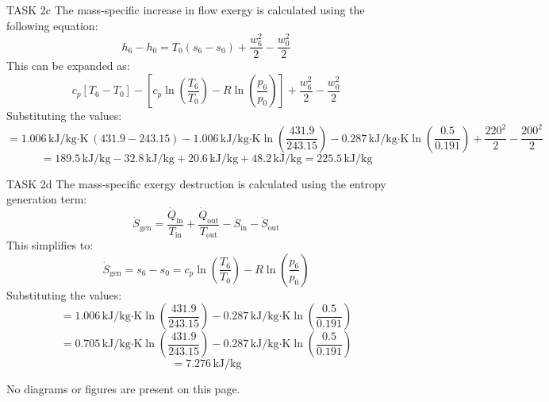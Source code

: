 TASK 2c  
The mass-specific increase in flow exergy is calculated using the following equation:  
\[
h_6 - h_0 = T_0 (s_6 - s_0) + \frac{w_6^2}{2} - \frac{w_0^2}{2}
\]  
This can be expanded as:  
\[
c_p [T_6 - T_0] - \left[ c_p \ln \left( \frac{T_6}{T_0} \right) - R \ln \left( \frac{p_6}{p_0} \right) \right] + \frac{w_6^2}{2} - \frac{w_0^2}{2}
\]  
Substituting the values:  
\[
= 1.006 \, \text{kJ/kg·K} \, (431.9 - 243.15) - 1.006 \, \text{kJ/kg·K} \ln \left( \frac{431.9}{243.15} \right) - 0.287 \, \text{kJ/kg·K} \ln \left( \frac{0.5}{0.191} \right) + \frac{220^2}{2} - \frac{200^2}{2}
\]  
\[
= 189.5 \, \text{kJ/kg} - 32.8 \, \text{kJ/kg} + 20.6 \, \text{kJ/kg} + 48.2 \, \text{kJ/kg} = 225.5 \, \text{kJ/kg}
\]

TASK 2d  
The mass-specific exergy destruction is calculated using the entropy generation term:  
\[
\dot{S}_{\text{gen}} = \frac{\dot{Q}_{\text{in}}}{T_{\text{in}}} + \frac{\dot{Q}_{\text{out}}}{T_{\text{out}}} - \dot{S}_{\text{in}} - \dot{S}_{\text{out}}
\]  
This simplifies to:  
\[
\dot{S}_{\text{gen}} = s_6 - s_0 = c_p \ln \left( \frac{T_6}{T_0} \right) - R \ln \left( \frac{p_6}{p_0} \right)
\]  
Substituting the values:  
\[
= 1.006 \, \text{kJ/kg·K} \ln \left( \frac{431.9}{243.15} \right) - 0.287 \, \text{kJ/kg·K} \ln \left( \frac{0.5}{0.191} \right)
\]  
\[
= 0.705 \, \text{kJ/kg·K} \ln \left( \frac{431.9}{243.15} \right) - 0.287 \, \text{kJ/kg·K} \ln \left( \frac{0.5}{0.191} \right)
\]  
\[
= 7.276 \, \text{kJ/kg}
\]  

No diagrams or figures are present on this page.